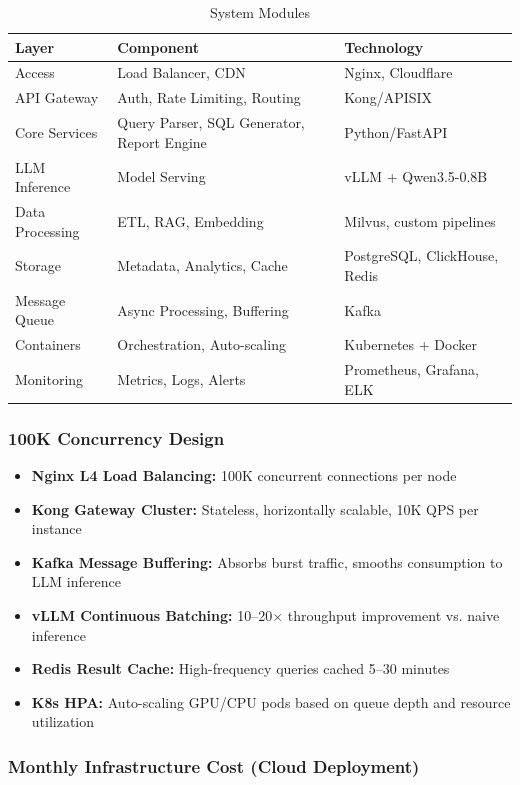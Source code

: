 \documentclass[12pt,a4paper]{article}
\begin{document}
\begin{table}[H]
\centering
\caption{System Modules}
\begin{tabular}{lll}
\toprule
\textbf{Layer} & \textbf{Component} & \textbf{Technology} \\
\midrule
Access & Load Balancer, CDN & Nginx, Cloudflare \\
API Gateway & Auth, Rate Limiting, Routing & Kong/APISIX \\
Core Services & Query Parser, SQL Generator, Report Engine & Python/FastAPI \\
LLM Inference & Model Serving & vLLM + Qwen3.5-0.8B \\
Data Processing & ETL, RAG, Embedding & Milvus, custom pipelines \\
Storage & Metadata, Analytics, Cache & PostgreSQL, ClickHouse, Redis \\
Message Queue & Async Processing, Buffering & Kafka \\
Containers & Orchestration, Auto-scaling & Kubernetes + Docker \\
Monitoring & Metrics, Logs, Alerts & Prometheus, Grafana, ELK \\
\bottomrule
\end{tabular}
\end{table}

\subsubsection{100K Concurrency Design}

\begin{itemize}[leftmargin=*]
    \item \textbf{Nginx L4 Load Balancing:} 100K concurrent connections per node
    \item \textbf{Kong Gateway Cluster:} Stateless, horizontally scalable, 10K QPS per instance
    \item \textbf{Kafka Message Buffering:} Absorbs burst traffic, smooths consumption to LLM inference
    \item \textbf{vLLM Continuous Batching:} 10--20$\times$ throughput improvement vs. naive inference
    \item \textbf{Redis Result Cache:} High-frequency queries cached 5--30 minutes
    \item \textbf{K8s HPA:} Auto-scaling GPU/CPU pods based on queue depth and resource utilization
\end{itemize}

\subsubsection{Monthly Infrastructure Cost (Cloud Deployment)}
\end{document}
